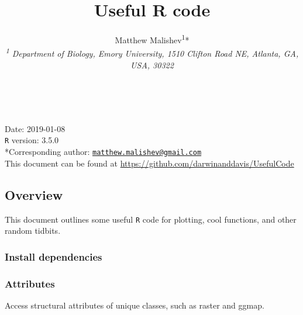\documentclass[10,portrait]{article}
\title{Useful R code}
\author{Matthew
Malishev\textsuperscript{1}*\\[2\baselineskip]\emph{\textsuperscript{1}
Department of Biology, Emory University, 1510 Clifton Road NE, Atlanta,
GA, USA, 30322}}
\date{}
\newenvironment{Shaded}{\begin{snugshade}}{\end{snugshade}}
\newcommand{\KeywordTok}[1]{\textcolor[rgb]{0.13,0.29,0.53}{\textbf{#1}}}
\newcommand{\DataTypeTok}[1]{\textcolor[rgb]{0.13,0.29,0.53}{#1}}
\newcommand{\DecValTok}[1]{\textcolor[rgb]{0.00,0.00,0.81}{#1}}
\newcommand{\StringTok}[1]{\textcolor[rgb]{0.31,0.60,0.02}{#1}}
\newcommand{\CommentTok}[1]{\textcolor[rgb]{0.56,0.35,0.01}{\textit{#1}}}
\newcommand{\OperatorTok}[1]{\textcolor[rgb]{0.81,0.36,0.00}{\textbf{#1}}}
\newcommand{\NormalTok}[1]{#1}
\begin{document}
\maketitle

{
\hypersetup{linkcolor=black}
\setcounter{tocdepth}{4}
\tableofcontents
}
~

Date: 2019-01-08\\
\texttt{R} version: 3.5.0\\
*Corresponding author:
\href{mailto:matthew.malishev@gmail.com}{\nolinkurl{matthew.malishev@gmail.com}}\\
This document can be found at
\url{https://github.com/darwinanddavis/UsefulCode}

\newpage  

\subsection{Overview}\label{overview}

This document outlines some useful \texttt{R} code for plotting, cool
functions, and other random tidbits.

\subsubsection{Install dependencies}\label{install-dependencies}

\subsubsection{Attributes}\label{attributes}

Access structural attributes of unique classes, such as raster and
ggmap.

\begin{Shaded}
\end{Shaded}
\end{document}
